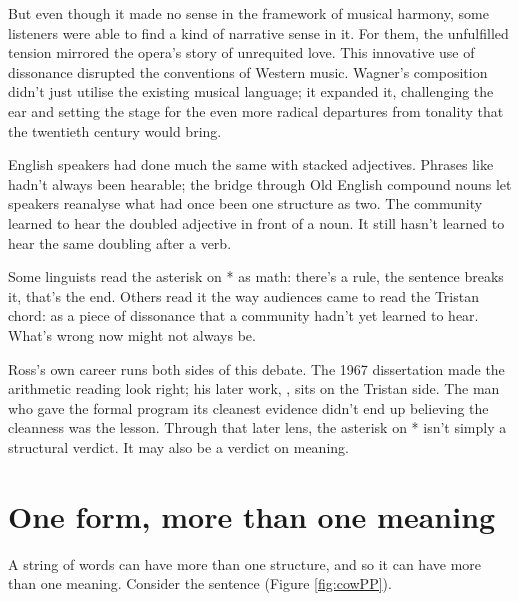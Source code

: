 But even though it made no sense in the framework of musical harmony, some listeners were able to find a kind of narrative sense in it. For them, the unfulfilled tension mirrored the opera's story of unrequited love. This innovative use of dissonance disrupted the conventions of Western music. Wagner's composition didn't just utilise the existing musical language; it expanded it, challenging the ear and setting the stage for the even more radical departures from tonality that the twentieth century would bring.

English speakers had done much the same with stacked adjectives. Phrases like  hadn't always been hearable; the bridge through Old English compound nouns let speakers reanalyse what had once been one structure as two. The community learned to hear the doubled adjective in front of a noun. It still hasn't learned to hear the same doubling after a verb.

Some linguists read the asterisk on * as math: there's a rule, the sentence breaks it, that's the end. Others read it the way audiences came to read the Tristan chord: as a piece of dissonance that a community hadn't yet learned to hear. What's wrong now might not always be.

Ross's own career runs both sides of this debate. The 1967 dissertation made the arithmetic reading look right; his later work, , sits on the Tristan side. The man who gave the formal program its cleanest evidence didn't end up believing the cleanness was the lesson. Through that later lens, the asterisk on * isn't simply a structural verdict. It may also be a verdict on meaning.

\section{One form, more than one meaning}

A string of words can have more than one structure, and so it can have more than one meaning. Consider the sentence  (Figure \ref{fig:cowPP}).

